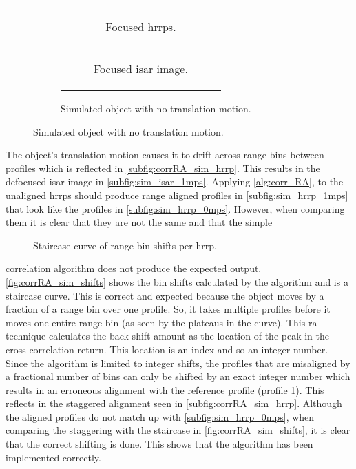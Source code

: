\documentclass[class=report,11pt,crop=false]{standalone}
\begin{document}
\begin{figure}[h]
\begin{minipage}{0.30\linewidth}
\begin{figure}
\begin{tabular}{@{}c@{}}
                    \begin{subfigure}{\linewidth}
                        \centering
                        \resizebox{\linewidth}{!}{}
                        \caption{Focused \gls{hrrp}s.\label{subfig:sim_hrrp_0mps}}
                    \end{subfigure}
                    \\
                    \begin{subfigure}{\linewidth}
                        \centering
                        \resizebox{\linewidth}{!}{}
                        \caption{Focused \gls{isar} image.\label{subfig:sim_isar_0mps}}
                    \end{subfigure}
                \end{tabular}
                \caption{Simulated object with no translation motion. \label{fig:sim_0mps}}
            \end{figure}
        \end{minipage}
    \end{figure}
    
    The object's translation motion causes it to drift across range bins between profiles which is reflected in \autoref{subfig:corrRA_sim_hrrp}. This results in the defocused \gls{isar} image in \autoref{subfig:sim_isar_1mps}. Applying \autoref{alg:corr_RA}, to the unaligned \gls{hrrp}s should produce range aligned profiles in \autoref{subfig:sim_hrrp_1mps} that look like the profiles in \autoref{subfig:sim_hrrp_0mps}. However, when comparing them it is clear that they are not the same and that the simple 
    \begin{wrapfigure}{l}{0.45\linewidth}
      \centering
      \resizebox{\linewidth}{!}{}
      \caption{Staircase curve of range bin shifts per \gls{hrrp}.\label{fig:corrRA_sim_shifts}}
    \end{wrapfigure}
    correlation algorithm does not produce the expected output. \autoref{fig:corrRA_sim_shifts} shows the bin shifts calculated by the algorithm and is a staircase curve. This is correct and expected because the object moves by a fraction of a range bin over one profile. So, it takes multiple profiles before it moves one entire range bin (as seen by the plateaus in the curve). This \gls{ra} technique calculates the back shift amount as the location of the peak in the cross-correlation return. This location is an index and so an integer number. Since the algorithm is limited to integer shifts, the profiles that are misaligned by a fractional number of bins can only be shifted by an exact integer number which results in an erroneous alignment with the reference profile (profile 1). This reflects in the staggered alignment seen in \autoref{subfig:corrRA_sim_hrrp}. Although the aligned profiles do not match up with \autoref{subfig:sim_hrrp_0mps}, when comparing the staggering with the staircase in \autoref{fig:corrRA_sim_shifts}, it is clear that the correct shifting is done. This shows that the algorithm has been implemented correctly. 
    
\end{document}
